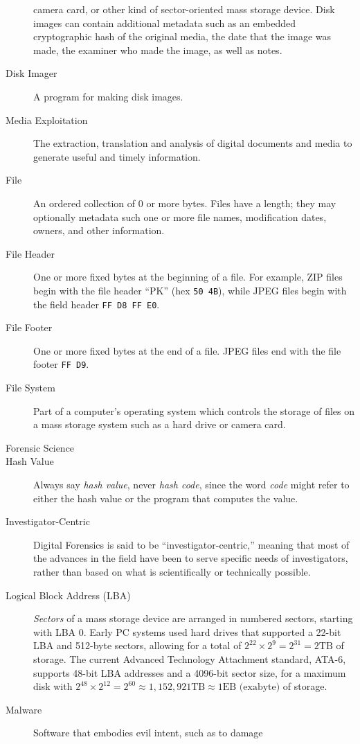 \begin{description}
  camera card, or other kind of sector-oriented mass storage
  device. Disk images can contain additional metadata such as an
  embedded cryptographic hash of the original media, the date that the
  image was made, the examiner who made the image, as well as notes.
\item[Disk Imager] A program for making disk images.
\item[Media Exploitation] The extraction, translation and
  analysis of digital documents and media to generate
  useful and timely information.
\item[File] An ordered collection of 0 or more bytes. Files have a
  length; they may optionally metadata such one or more file names,
  modification dates, owners, and other information.
\item[File Header] One or more fixed bytes at the beginning of a
  file. For example, ZIP files begin with the file header ``PK'' (hex
  \texttt{50 4B}), while JPEG files begin with the field header
  \texttt{FF D8 FF E0}.
\item[File Footer] One or more fixed bytes at the end of a file. JPEG
  files end with the file footer \texttt{FF D9}.
\item[File System] Part of a computer's operating system which
  controls the storage of files on a mass storage system such as a
  hard drive or camera card.
\item[Forensic Science]
\item[Hash Value] Always say \emph{hash value}, never \emph{hash
  code}, since the word \emph{code} might refer to either the hash
  value or the program that computes the value.
\item[Investigator-Centric] Digital Forensics is said to be
  ``investigator-centric,'' meaning that most of the advances in the
  field have been to serve specific needs of investigators, rather
  than based on what is scientifically or technically possible.
\item[Logical Block Address (LBA)] \emph{Sectors} of a mass storage
  device are arranged in numbered sectors, starting with LBA 0. Early
  PC systems used hard drives that supported a 22-bit LBA and 512-byte sectors, allowing for a
  total of $2^{22}\times 2^{9}=2^{31}=2\textrm{TB}$ of storage. The
  current Advanced Technology Attachment standard, ATA-6, supports
  48-bit LBA addresses and a 4096-bit sector size, for a maximum disk
  with $2^{48}\times 2^{12}=2^{60}\approx 1,152,921\textrm{TB} \approx 1
  \textrm{EB (exabyte)}$ of storage.
\item[Malware] Software that embodies evil intent, such as to damage

\end{description}
